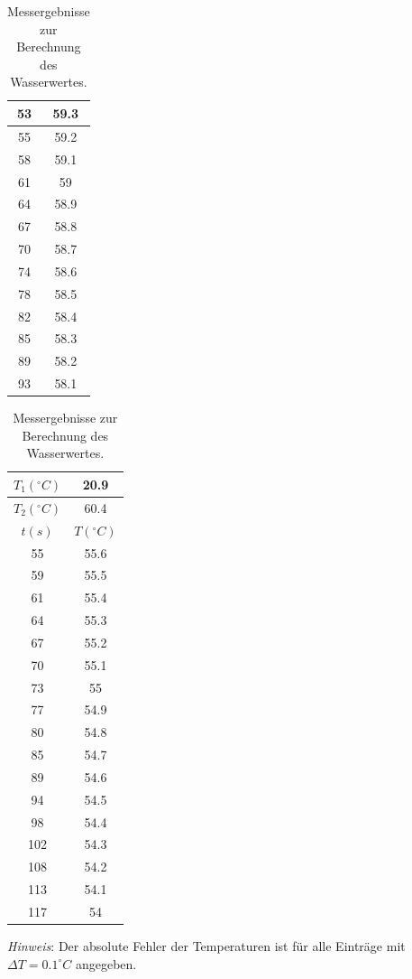 \documentclass[10pt,a4paper]{article}
\begin{document}
\begin{table}[h]
{\begin{subtable}[t]{0.2\textwidth}
\begin{tabular}{|c|c|}
\hline
53 & 59.3 \\ 
\hline
55 & 59.2 \\ 
\hline
58 & 59.1 \\ 
\hline
61 & 59 \\ 
\hline
64 & 58.9 \\ 
\hline
67 & 58.8 \\ 
\hline
70 & 58.7 \\ 
\hline
74 & 58.6 \\ 
\hline
78 & 58.5 \\ 
\hline
82 & 58.4 \\ 
\hline
85 & 58.3 \\ 
\hline
89 & 58.2 \\ 
\hline
93 & 58.1 \\ 
\hline
\end{tabular}%
\end{subtable}
%
\begin{subtable}[t]{0.2\textwidth}
\centering
{}
\label{tab:r5}
\begin{tabular}{|c|c|}
\hline
$T_1 (^{\circ}C)$ & 20.9 \\
\hline
$T_2 (^{\circ}C)$ & 60.4 \\
\hline
\hline
\hline
$t (s)$ & $T (^{\circ}C)$ \\
\hline
55 & 55.6 \\ 
\hline
59 & 55.5 \\ 
\hline
61 & 55.4 \\ 
\hline
64 & 55.3 \\ 
\hline
67 & 55.2 \\ 
\hline
70 & 55.1 \\ 
\hline
73 & 55 \\ 
\hline
77 & 54.9 \\ 
\hline
80 & 54.8 \\ 
\hline
85 & 54.7 \\ 
\hline
89 & 54.6 \\ 
\hline
94 & 54.5 \\ 
\hline
98 & 54.4 \\ 
\hline
102 & 54.3 \\ 
\hline
108 & 54.2 \\ 
\hline
113 & 54.1 \\ 
\hline
117 & 54 \\ 
\hline
\end{tabular}
\end{subtable}%
}

\caption{Messergebnisse zur Berechnung des Wasserwertes.}
\label{tab:reihen}
\end{table}
\textit{Hinweis}: Der absolute Fehler der Temperaturen ist für alle Einträge mit $\Delta T = 0.1 ^{\circ}C$ angegeben.
\end{document}
